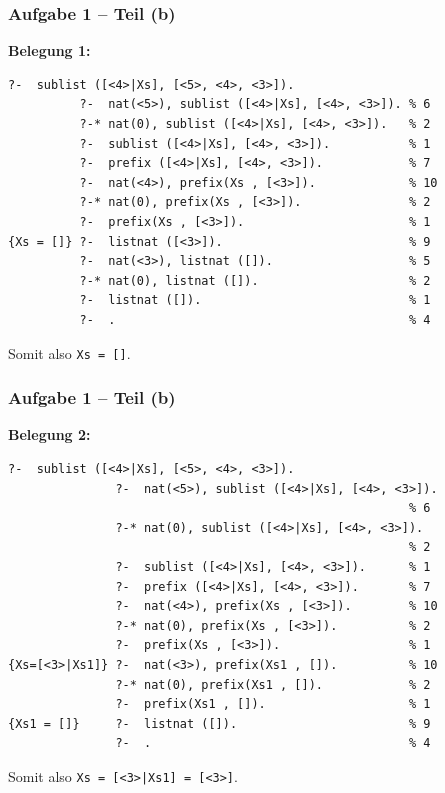 \documentclass{beamer}
\begin{document}
\begin{frame}[fragile] \frametitle{Aufgabe 1 -- Teil (b)}
	\footnotesize
	\textbf{Belegung 1:}
	
	\begin{lstlisting}[style=refutation, basicstyle=\ttfamily\scriptsize]
          ?-  sublist ([<4>|Xs], [<5>, <4>, <3>]).
          ?-  nat(<5>), sublist ([<4>|Xs], [<4>, <3>]). % 6
          ?-* nat(0), sublist ([<4>|Xs], [<4>, <3>]).   % 2
          ?-  sublist ([<4>|Xs], [<4>, <3>]).           % 1
          ?-  prefix ([<4>|Xs], [<4>, <3>]).            % 7
          ?-  nat(<4>), prefix(Xs , [<3>]).             % 10
          ?-* nat(0), prefix(Xs , [<3>]).               % 2
          ?-  prefix(Xs , [<3>]).                       % 1
{Xs = []} ?-  listnat ([<3>]).                          % 9
          ?-  nat(<3>), listnat ([]).                   % 5
          ?-* nat(0), listnat ([]).                     % 2
          ?-  listnat ([]).                             % 1
          ?-  .                                         % 4
	\end{lstlisting}
	Somit also \texttt{Xs = []}.
\end{frame}

\begin{frame}[fragile] \frametitle{Aufgabe 1 -- Teil (b)}
	\footnotesize
	\textbf{Belegung 2:}
	
	\begin{lstlisting}[style=refutation, basicstyle=\ttfamily\scriptsize]
               ?-  sublist ([<4>|Xs], [<5>, <4>, <3>]).
               ?-  nat(<5>), sublist ([<4>|Xs], [<4>, <3>]). 
                                                        % 6
               ?-* nat(0), sublist ([<4>|Xs], [<4>, <3>]).  
                                                        % 2
               ?-  sublist ([<4>|Xs], [<4>, <3>]).      % 1
               ?-  prefix ([<4>|Xs], [<4>, <3>]).       % 7
               ?-  nat(<4>), prefix(Xs , [<3>]).        % 10
               ?-* nat(0), prefix(Xs , [<3>]).          % 2
               ?-  prefix(Xs , [<3>]).                  % 1
{Xs=[<3>|Xs1]} ?-  nat(<3>), prefix(Xs1 , []).          % 10
               ?-* nat(0), prefix(Xs1 , []).            % 2
               ?-  prefix(Xs1 , []).                    % 1
{Xs1 = []}     ?-  listnat ([]).                        % 9
               ?-  .                                    % 4
	\end{lstlisting}
	
	Somit also \texttt{Xs = [<3>|Xs1] = [<3>]}.
\end{frame}
\end{document}
